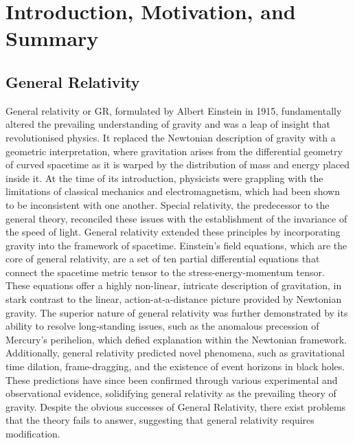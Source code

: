 \documentclass[11pt]{report}
\numberwithin{equation}{chapter}
\begin{document}
\tableofcontents

\newpage

\chapter{Introduction, Motivation, and Summary}

\section{General Relativity}
General relativity or GR, formulated by Albert Einstein in 1915\cite{GR}, fundamentally altered the prevailing understanding of gravity and was a leap of insight that revolutionised physics. It replaced the Newtonian description of gravity with a geometric interpretation, where gravitation arises from the differential geometry of curved spacetime as it is warped by the distribution of mass and energy placed inside it. At the time of its introduction, physicists were grappling with the limitations of classical mechanics and electromagnetism, which had been shown to be inconsistent with one another. Special relativity, the predecessor to the general theory, reconciled these issues with the establishment of the invariance of the speed of light. General relativity extended these principles by incorporating gravity into the framework of spacetime. Einstein's field equations, which are the core of general relativity, are a set of ten partial differential equations that connect the spacetime metric tensor to the stress-energy-momentum tensor. These equations offer a highly non-linear, intricate description of gravitation, in stark contrast to the linear, action-at-a-distance picture provided by Newtonian gravity. The superior nature of general relativity was further demonstrated by its ability to resolve long-standing issues, such as the anomalous precession of Mercury's perihelion, which defied explanation within the Newtonian framework. Additionally, general relativity predicted novel phenomena, such as gravitational time dilation, frame-dragging, and the existence of event horizons in black holes. These predictions have since been confirmed through various experimental and observational evidence, solidifying general relativity as the prevailing theory of gravity\cite{GRTests}. Despite the obvious successes of General Relativity, there exist problems that the theory fails to answer, suggesting that general relativity requires modification.
\end{document}
